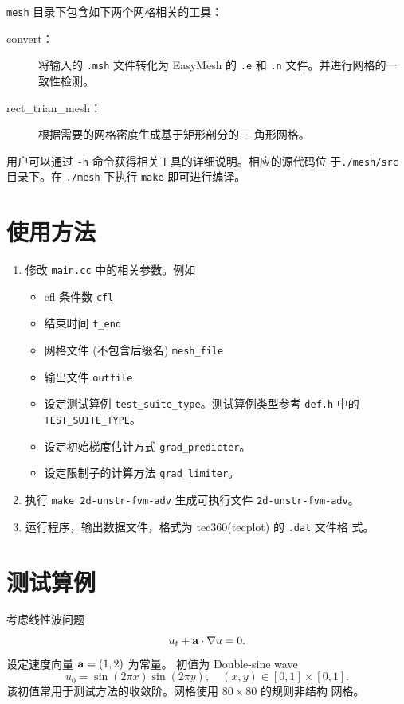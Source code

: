 \verb|mesh| 目录下包含如下两个网格相关的工具：
\begin{description}
\item[convert：] 将输入的 \verb|.msh| 文件转化为 EasyMesh 的
  \verb|.e| 和 \verb|.n| 文件。并进行网格的一致性检测。
\item[rect\_trian\_mesh：] 根据需要的网格密度生成基于矩形剖分的三
  角形网格。
\end{description}
用户可以通过 \verb|-h| 命令获得相关工具的详细说明。相应的源代码位
于\verb|./mesh/src| 目录下。在 \verb|./mesh| 下执行 \verb|make|
即可进行编译。

\section{使用方法}
\label{sec:how-to-use}
\begin{enumerate}
\item 修改 \verb|main.cc| 中的相关参数。例如
  \begin{itemize}
  \item cfl 条件数 \verb|cfl|
  \item 结束时间 \verb|t_end|
  \item 网格文件 (不包含后缀名) \verb|mesh_file|
  \item 输出文件 \verb|outfile|
  \item 设定测试算例 \verb|test_suite_type|。测试算例类型参考
    \verb|def.h| 中的 \verb|TEST_SUITE_TYPE|。
  \item 设定初始梯度估计方式 \verb|grad_predicter|。
  \item 设定限制子的计算方法 \verb|grad_limiter|。
  \end{itemize}
\item 执行 \verb|make 2d-unstr-fvm-adv| 生成可执行文件 \verb|2d-unstr-fvm-adv|。
\item 运行程序，输出数据文件，格式为 tec360(tecplot) 的 \verb|.dat| 文件格
  式。
\end{enumerate}

\section{测试算例}
\label{sec:test-case}
考虑线性波问题
\begin{equation}
  \label{eq:linear-wave-problem}
  u_{t} + {\bf{a}} \cdot \nabla u = 0.
\end{equation}
设定速度向量 ${\bf{a}} = (1,2)$ 为常量。 初值为 Double-sine wave
\begin{equation}
  \label{eq:double-sine-wave}
  u_{0} = \sin(2\pi x) \sin(2\pi y), \quad (x,y) \in [0,1] \times[0,1].
\end{equation}
该初值常用于测试方法的收敛阶。网格使用 $80\times80$ 的规则非结构
网格。

